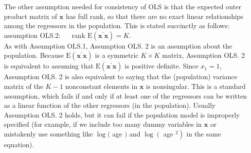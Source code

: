 \documentclass[10pt]{article}
\begin{document}
The other assumption needed for consistency of OLS is that the expected outer product matrix of $\mathbf{x}$ has full rank, so that there are no exact linear relationships among the regressors in the population. This is stated succinctly as follows:\\
assumption OLS.2: $\quad$ rank $\mathrm{E}\left(\mathbf{x}^{\prime} \mathbf{x}\right)=K$.\\
As with Assumption OLS.1, Assumption OLS. 2 is an assumption about the population. Because $\mathrm{E}\left(\mathbf{x}^{\prime} \mathbf{x}\right)$ is a symmetric $K \times K$ matrix, Assumption OLS. 2 is equivalent to assuming that $\mathrm{E}\left(\mathbf{x}^{\prime} \mathbf{x}\right)$ is positive definite. Since $x_{1}=1$, Assumption OLS. 2 is also equivalent to saying that the (population) variance matrix of the $K-1$ nonconstant elements in $\mathbf{x}$ is nonsingular. This is a standard assumption, which fails if and only if at least one of the regressors can be written as a linear function of the other regressors (in the population). Usually Assumption OLS. 2 holds, but it can fail if the population model is improperly specified (for example, if we include too many dummy variables in $\mathbf{x}$ or mistakenly use something like $\log ($ age $)$ and $\log \left(\right.$ age $\left.{ }^{2}\right)$ in the same equation).
\end{document}
